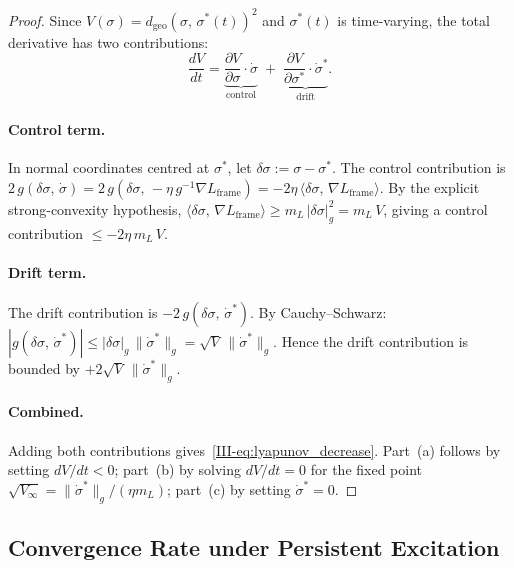 \documentclass[12pt,a4paper,openany]{book}
\begin{document}
\begin{proof}
Since $V(\sigma) = d_{\mathrm{geo}}(\sigma,\,\sigma^*(t))^2$
and $\sigma^*(t)$ is time-varying, the total derivative
has two contributions:
\begin{equation*}
\frac{dV}{dt}
= \underbrace{\frac{\partial V}{\partial \sigma}
  \cdot \dot{\sigma}}_{\text{control}}
\;+\; \underbrace{\frac{\partial V}{\partial \sigma^*}
  \cdot \dot{\sigma}^*}_{\text{drift}}.
\end{equation*}

\paragraph{Control term.}
In normal coordinates centred at $\sigma^*$, let
$\delta\sigma := \sigma - \sigma^*$.
The control contribution is
$2\,g(\delta\sigma,\,\dot{\sigma})
= 2\,g(\delta\sigma,\,-\eta\,g^{-1}\nabla L_{\mathrm{frame}})
= -2\eta\,\langle \delta\sigma,\,
\nabla L_{\mathrm{frame}}\rangle$.
By the explicit strong-convexity hypothesis,
$\langle \delta\sigma,\,\nabla L_{\mathrm{frame}}\rangle
\geq m_L\,|\delta\sigma|_g^2 = m_L\,V$,
giving a control contribution $\leq -2\eta\,m_L\,V$.

\paragraph{Drift term.}
The drift contribution is
$-2\,g(\delta\sigma,\,\dot{\sigma}^*)$.
By Cauchy--Schwarz:
$|g(\delta\sigma,\,\dot{\sigma}^*)|
\leq |\delta\sigma|_g\,\|\dot{\sigma}^*\|_g
= \sqrt{V}\,\|\dot{\sigma}^*\|_g$.
Hence the drift contribution is bounded by
$+2\sqrt{V}\,\|\dot{\sigma}^*\|_g$.

\paragraph{Combined.}
Adding both contributions
gives~\eqref{III-eq:lyapunov_decrease}.
Part~(a) follows by setting
$dV/dt < 0$; part~(b) by solving $dV/dt = 0$ for
the fixed point $\sqrt{V_\infty}
= \|\dot{\sigma}^*\|_g/(\eta m_L)$;
part~(c) by setting $\dot{\sigma}^* = 0$.
\end{proof}

\subsection{Convergence Rate under Persistent Excitation}
\label{III-subsec:convergence}
\end{document}
